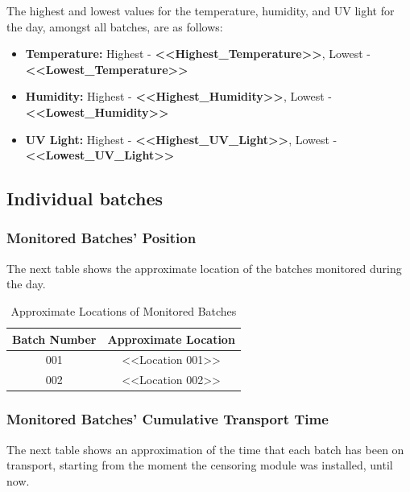 \documentclass[daily]{engenius}
\begin{document}
The highest and lowest values for the temperature, humidity, and UV light for the day, amongst all batches, are as follows:

\begin{itemize}
    \item \textbf{Temperature:} Highest - \textbf{<<Highest\_Temperature>>}, Lowest - \textbf{<<Lowest\_Temperature>>}
    \item \textbf{Humidity:} Highest - \textbf{<<Highest\_Humidity>>}, Lowest - \textbf{<<Lowest\_Humidity>>}
    \item \textbf{UV Light:} Highest - \textbf{<<Highest\_UV\_Light>>}, Lowest - \textbf{<<Lowest\_UV\_Light>>}
\end{itemize}


\subsection{Individual batches}

\subsubsection{Monitored Batches' Position}

The next table shows the approximate location of the batches monitored during the day.

\begin{table}[ht]
    \centering
    \begin{tabular}{|c|c|}
        \hline
        \textbf{Batch Number} & \textbf{Approximate Location} \\
        \hline
        001 & <<Location 001>> \\
        002 & <<Location 002>> \\
        \hline
    \end{tabular}
    \caption{Approximate Locations of Monitored Batches}
    \label{tab:batch_positions}
\end{table}


\subsubsection{Monitored Batches' Cumulative Transport Time}

The next table shows an approximation of the time that each batch has been on transport, starting from the moment the censoring module was installed, until now.
\end{document}
